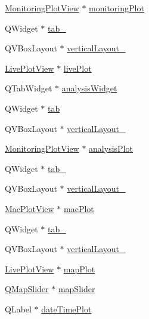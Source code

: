 \begin{DoxyCompactItemize}
\hyperlink{class_monitoring_plot_view}{Monitoring\+Plot\+View} $\ast$ \hyperlink{class_ui___main_window_a971deb6c4d754f548d0a725100369a92}{monitoring\+Plot}
\item 
Q\+Widget $\ast$ \hyperlink{class_ui___main_window_a7d8a29446578759800fab35c698b6be2}{tab\+\_}
\item 
Q\+V\+Box\+Layout $\ast$ \hyperlink{class_ui___main_window_a7b66d5d6ab55f3977317359d09a42345}{vertical\+Layout\+\_}
\item 
\hyperlink{class_live_plot_view}{Live\+Plot\+View} $\ast$ \hyperlink{class_ui___main_window_a29496d8d5cafa452f6f9b686ae8e6ba5}{live\+Plot}
\item 
Q\+Tab\+Widget $\ast$ \hyperlink{class_ui___main_window_abd26524bcb58b7b6f430936e27c56af7}{analysis\+Widget}
\item 
Q\+Widget $\ast$ \hyperlink{class_ui___main_window_a3efc28c664e9f5115095aafbbc5ac6bc}{tab}
\item 
Q\+V\+Box\+Layout $\ast$ \hyperlink{class_ui___main_window_a38b8a4b887f3b58e2a49e7905ae6f1f0}{vertical\+Layout\+\_}
\item 
\hyperlink{class_monitoring_plot_view}{Monitoring\+Plot\+View} $\ast$ \hyperlink{class_ui___main_window_a5e88d901f08f14edabeabc9091f759d3}{analysis\+Plot}
\item 
Q\+Widget $\ast$ \hyperlink{class_ui___main_window_a83495b23cbc6810f81978dc0d584b810}{tab\+\_}
\item 
Q\+V\+Box\+Layout $\ast$ \hyperlink{class_ui___main_window_a6f40fc110b15410c00837a446d57bdbe}{vertical\+Layout\+\_}
\item 
\hyperlink{class_mac_plot_view}{Mac\+Plot\+View} $\ast$ \hyperlink{class_ui___main_window_a70f6dd98a456574fdee4c4fe63b1b1a9}{mac\+Plot}
\item 
Q\+Widget $\ast$ \hyperlink{class_ui___main_window_aa9899d9e0d47ad34988a47a9d58c9d4c}{tab\+\_}
\item 
Q\+V\+Box\+Layout $\ast$ \hyperlink{class_ui___main_window_aaa8cc393d5a44562d629a9f646d2c6dd}{vertical\+Layout\+\_}
\item 
\hyperlink{class_live_plot_view}{Live\+Plot\+View} $\ast$ \hyperlink{class_ui___main_window_ab2815473a83816dab50ff80a1de2c002}{map\+Plot}
\item 
\hyperlink{class_q_map_slider}{Q\+Map\+Slider} $\ast$ \hyperlink{class_ui___main_window_a6d766109626195b8d80d2d1d5b88401e}{map\+Slider}
\item 
Q\+Label $\ast$ \hyperlink{class_ui___main_window_aa948cc2fcfc89b31429481d2cbd6e4d7}{date\+Time\+Plot}

\end{DoxyCompactItemize}
